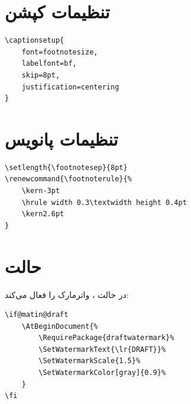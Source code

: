 
\section{تنظیمات کپشن}
\label{sec:layout-captions}

\begin{latin}
\begin{verbatim}
\captionsetup{
    font=footnotesize,
    labelfont=bf,
    skip=8pt,
    justification=centering
}
\end{verbatim}
\end{latin}


\section{تنظیمات پانویس}
\label{sec:layout-footnotes}

\begin{latin}
\begin{verbatim}
\setlength{\footnotesep}{8pt}
\renewcommand{\footnoterule}{%
    \kern-3pt
    \hrule width 0.3\textwidth height 0.4pt
    \kern2.6pt
}
\end{verbatim}
\end{latin}


\section{حالت }
\label{sec:layout-draft}

در حالت ،  واترمارک
 را فعال می‌کند:

\begin{latin}
\begin{verbatim}
\if@matin@draft
    \AtBeginDocument{%
        \RequirePackage{draftwatermark}%
        \SetWatermarkText{\lr{DRAFT}}%
        \SetWatermarkScale{1.5}%
        \SetWatermarkColor[gray]{0.9}%
    }
\fi
\end{verbatim}
\end{latin}


